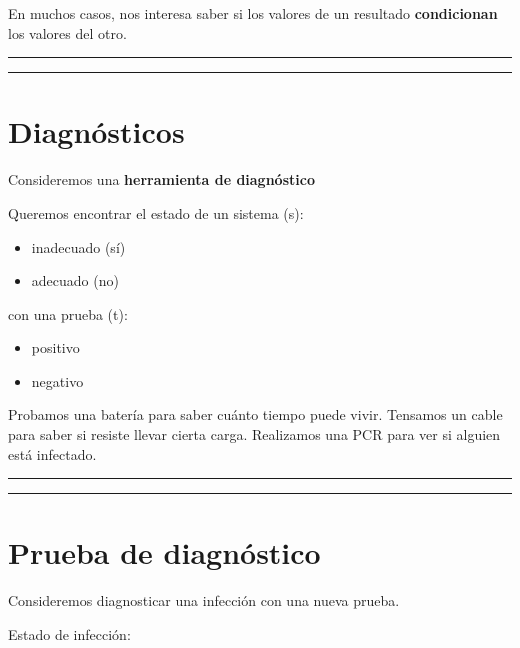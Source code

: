 \documentclass[
]{book}
\providecommand{\tightlist}{%
  \setlength{\itemsep}{0pt}\setlength{\parskip}{0pt}}
\begin{document}
En muchos casos, nos interesa saber si los valores de un resultado \textbf{condicionan} los valores del otro.

\begin{center}\rule{0.5\linewidth}{0.5pt}\end{center}

\begin{center}\rule{0.5\linewidth}{0.5pt}\end{center}

\hypertarget{diagnuxf3sticos}{%
\section{Diagnósticos}\label{diagnuxf3sticos}}

Consideremos una \textbf{herramienta de diagnóstico}

Queremos encontrar el estado de un sistema (s):

\begin{itemize}
\tightlist
\item
  inadecuado (sí)
\item
  adecuado (no)
\end{itemize}

con una prueba (t):

\begin{itemize}
\tightlist
\item
  positivo
\item
  negativo
\end{itemize}

Probamos una batería para saber cuánto tiempo puede vivir. Tensamos un cable para saber si resiste llevar cierta carga. Realizamos una PCR para ver si alguien está infectado.

\begin{center}\rule{0.5\linewidth}{0.5pt}\end{center}

\begin{center}\rule{0.5\linewidth}{0.5pt}\end{center}

\hypertarget{prueba-de-diagnuxf3stico}{%
\section{Prueba de diagnóstico}\label{prueba-de-diagnuxf3stico}}

Consideremos diagnosticar una infección con una nueva prueba.

Estado de infección:
\end{document}
